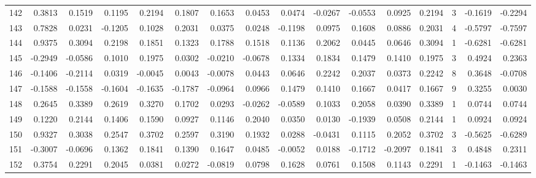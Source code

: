 \begin{tabular}{lrrrrrrrrrrrrrrr}
142 &      0.3813 &  0.1519 &  0.1195 &  0.2194 &  0.1807 &  0.1653 &  0.0453 &  0.0474 & -0.0267 & -0.0553 &   0.0925 &     0.2194 &      3 &                   -0.1619 &                    -0.2294 \\
143 &      0.7828 &  0.0231 & -0.1205 &  0.1028 &  0.2031 &  0.0375 &  0.0248 & -0.1198 &  0.0975 &  0.1608 &   0.0886 &     0.2031 &      4 &                   -0.5797 &                    -0.7597 \\
144 &      0.9375 &  0.3094 &  0.2198 &  0.1851 &  0.1323 &  0.1788 &  0.1518 &  0.1136 &  0.2062 &  0.0445 &   0.0646 &     0.3094 &      1 &                   -0.6281 &                    -0.6281 \\
145 &     -0.2949 & -0.0586 &  0.1010 &  0.1975 &  0.0302 & -0.0210 & -0.0678 &  0.1334 &  0.1834 &  0.1479 &   0.1410 &     0.1975 &      3 &                    0.4924 &                     0.2363 \\
146 &     -0.1406 & -0.2114 &  0.0319 & -0.0045 &  0.0043 & -0.0078 &  0.0443 &  0.0646 &  0.2242 &  0.2037 &   0.0373 &     0.2242 &      8 &                    0.3648 &                    -0.0708 \\
147 &     -0.1588 & -0.1558 & -0.1604 & -0.1635 & -0.1787 & -0.0964 &  0.0966 &  0.1479 &  0.1410 &  0.1667 &   0.0417 &     0.1667 &      9 &                    0.3255 &                     0.0030 \\
148 &      0.2645 &  0.3389 &  0.2619 &  0.3270 &  0.1702 &  0.0293 & -0.0262 & -0.0589 &  0.1033 &  0.2058 &   0.0390 &     0.3389 &      1 &                    0.0744 &                     0.0744 \\
149 &      0.1220 &  0.2144 &  0.1406 &  0.1590 &  0.0927 &  0.1146 &  0.2040 &  0.0350 &  0.0130 & -0.1939 &   0.0508 &     0.2144 &      1 &                    0.0924 &                     0.0924 \\
150 &      0.9327 &  0.3038 &  0.2547 &  0.3702 &  0.2597 &  0.3190 &  0.1932 &  0.0288 & -0.0431 &  0.1115 &   0.2052 &     0.3702 &      3 &                   -0.5625 &                    -0.6289 \\
151 &     -0.3007 & -0.0696 &  0.1362 &  0.1841 &  0.1390 &  0.1647 &  0.0485 & -0.0052 &  0.0188 & -0.1712 &  -0.2097 &     0.1841 &      3 &                    0.4848 &                     0.2311 \\
152 &      0.3754 &  0.2291 &  0.2045 &  0.0381 &  0.0272 & -0.0819 &  0.0798 &  0.1628 &  0.0761 &  0.1508 &   0.1143 &     0.2291 &      1 &                   -0.1463 &                    -0.1463 \\

\end{tabular}
